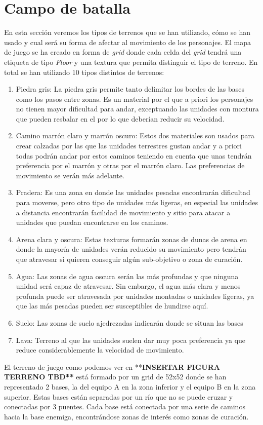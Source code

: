\section{Campo de batalla}
En esta sección veremos los tipos de terrenos que se han utilizado, cómo se han usado y cual será su forma de afectar al movimiento de los personajes. El mapa de juego se ha creado en forma de \textit{grid} donde cada celda del \textit{grid} tendrá una etiqueta de tipo \textit{Floor} y una textura que permita distinguir el tipo de terreno. En total se han utilizado 10 tipos distintos de terrenos:
\begin{enumerate}
    \item Piedra gris: La piedra gris permite tanto delimitar los bordes de las bases como los pasos entre zonas. Es un material por el que a priori los personajes no tienen mayor dificultad para andar, exceptuando las unidades con montura que pueden resbalar en el por lo que deberían reducir su velocidad.  
    \item Camino marrón claro y marrón oscuro: Estos dos materiales son usados para crear calzadas por las que las unidades terrestres gustan andar y a priori todas podrán andar por estos caminos teniendo en cuenta que unas tendrán preferencia por el marrón y otras por el marrón claro. Las preferencias de movimiento se verán más adelante.
    \item Pradera: Es una zona en donde las unidades pesadas encontrarán dificultad para moverse, pero otro tipo de unidades más ligeras, en especial las unidades a distancia encontrarán facilidad de movimiento y sitio para atacar a unidades que puedan encontrarse en los caminos.
    \item Arena clara y oscura: Estas texturas formarán zonas de dunas de arena en donde la mayoría de unidades verán reducido su movimiento pero tendrán que atravesar si quieren conseguir algún sub-objetivo o zona de curación. 
    \item Agua: Las zonas de agua oscura serán las más profundas y que ninguna unidad será capaz de atravesar. Sin embargo, el agua más clara y menos profunda puede ser atravesada por unidades montadas o unidades ligeras, ya que las más pesadas pueden ser susceptibles de hundirse aquí.
    \item Suelo: Las zonas de suelo ajedrezadas indicarán donde se situan las bases  
    \item Lava: Terreno al que las unidades suelen dar muy poca preferencia ya que reduce considerablemente la velocidad de movimiento.
\end{enumerate}
El terreno de juego como podemos ver en **\textbf{INSERTAR FIGURA TERRENO TBD**} está formado por un grid de 52x52 donde se han representado 2 bases, la del equipo A en la zona inferior y el equipo B en la zona superior. Estas bases están separadas por un río que no se puede cruzar y conectadas por 3 puentes. Cada base está conectada por una serie de caminos hacia la base enemiga, encontrándose zonas de interés como zonas de curación.

